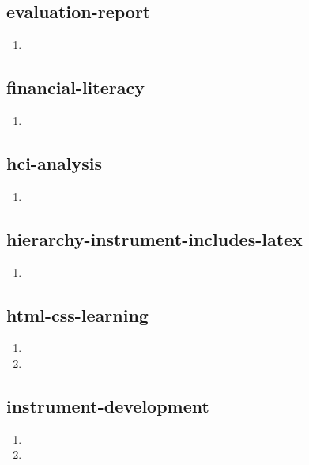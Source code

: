 \documentclass{article}
\begin{document}
\subsection{evaluation-report}
\begin{enumerate}
\item {}
\end{enumerate}

\subsection{financial-literacy}
\begin{enumerate}
\item {}
\end{enumerate}

\subsection{hci-analysis}
\begin{enumerate}
\item {}
\end{enumerate}

\subsection{hierarchy-instrument-includes-latex}
\begin{enumerate}
\item {}
\end{enumerate}

\subsection{html-css-learning}
\begin{enumerate}
\item {}
\item {}
\end{enumerate}

\subsection{instrument-development}
\begin{enumerate}
\item {}
\item {}
\end{enumerate}
\end{document}
